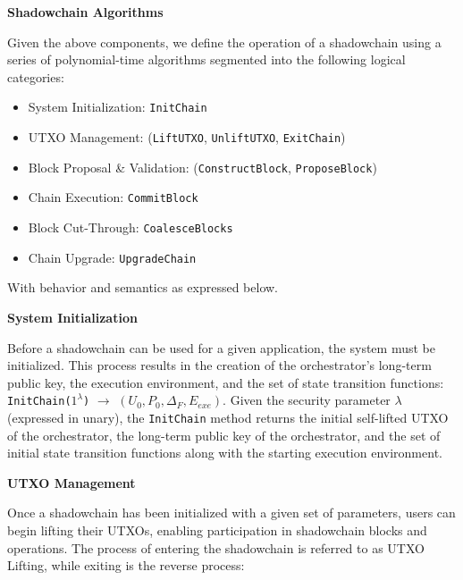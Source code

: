 \documentclass[10pt,a4paper]{article}
\theoremstyle{definition}
\begin{document}
\begin{center}
    \textbf{Shadowchain Algorithms}
\end{center}

Given the above components, we define the operation of a shadowchain using a
series of polynomial-time algorithms segmented into the following logical
categories:

\begin{itemize}
    \item System Initialization: \texttt{InitChain}
    \item UTXO Management: (\texttt{LiftUTXO}, \texttt{UnliftUTXO}, \texttt{ExitChain})
    \item Block Proposal \& Validation: (\texttt{ConstructBlock}, \texttt{ProposeBlock})
    \item Chain Execution: \texttt{CommitBlock}
    \item Block Cut-Through: \texttt{CoalesceBlocks}
    \item Chain Upgrade: \texttt{UpgradeChain}
\end{itemize}


With behavior and semantics as expressed below. \\

\begin{center}
    \textbf{System Initialization}
\end{center}

Before a shadowchain can be used for a given application, the system must be
initialized. This process results in the creation of the orchestrator's
long-term public key, the execution environment, and the set of state
transition functions: \\

\texttt{InitChain($1^{\lambda}$)} $\rightarrow$ $(U_{0}, P_{0}, \Delta_F,
E_{exe})$. Given the security parameter $\lambda$ (expressed in unary), the
\texttt{InitChain} method returns the initial self-lifted UTXO of the
orchestrator, the long-term public key of the orchestrator, and the set of
initial state transition functions along with the starting execution
environment.


\begin{center}
    \textbf{UTXO Management}
\end{center}

Once a shadowchain has been initialized with a given set of parameters, users
can begin lifting their UTXOs, enabling participation in shadowchain blocks and
operations. The process of entering the shadowchain is referred to as UTXO
Lifting, while exiting is the reverse process: \\
\end{document}
